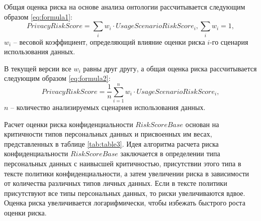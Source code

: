 \documentclass[../main]{subfiles}
\begin{document}
Общая оценка риска на основе анализа онтологии рассчитывается следующим образом \ref{eq:formula1}: 
\begin{equation}
    \label{eq:formula1}
    PrivacyRiskScore = \sum_i{w_i} \cdot UsageScenarioRiskScore_i, \sum_{i}{w_i} = 1,
\end{equation}
$w_i$ -- весовой коэффициент, определяющий влияние оценки риска $i$-го сценария использования данных. 

В текущей версии все $w_i$ равны друг другу, а общая оценка риска рассчитывается следующим образом \ref{eq:formula2}: 
\begin{equation}
    \label{eq:formula2}
    PrivacyRiskScore = \frac{1}{n}\sum^n_{i=1}{w_i} \cdot UsageScenarioRiskScore_i,
\end{equation}
$n$ -- количество анализируемых сценариев использования данных.

Расчет оценки риска конфиденциальности $RiskScoreBase$ основан на критичности типов персональных данных и присвоенных им весах, представленных в таблице \ref{tab:table3}. Идея алгоритма расчета риска конфиденциальности $RiskScoreBase$ заключается в определении типа персональных данных с наивысшей критичностью, присутствии этого типа в тексте политики конфиденциальности, а затем увеличении риска в зависимости от количества различных типов личных данных. Если в тексте политики присутствуют все типы персональных данных, то риски увеличиваются вдвое. Оценка риска увеличивается логарифмически, чтобы избежать быстрого роста оценки риска. 
\end{document}
